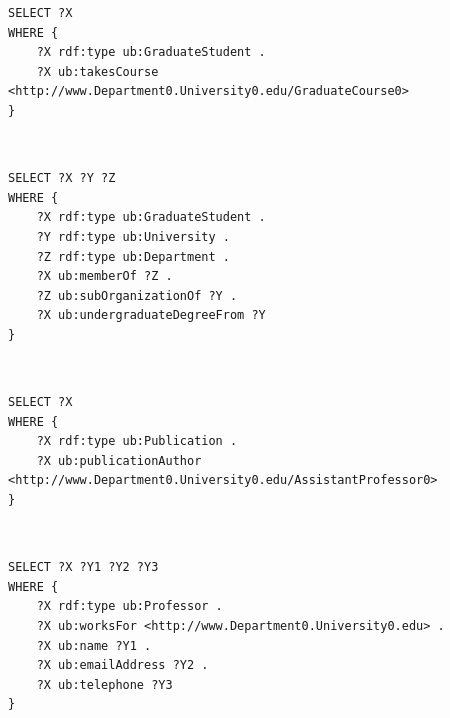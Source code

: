 \documentclass[10pt, a4paper]{report}
\begin{document}
\begin{enumerate}
	\begin{minipage}{0.92\textwidth}
		\item \label{query:lumb_sparql_1}
		\lstset{language=sql}
		\begin{lstlisting}
SELECT ?X
WHERE {
    ?X rdf:type ub:GraduateStudent .
    ?X ub:takesCourse <http://www.Department0.University0.edu/GraduateCourse0>
}
                        \end{lstlisting}
	\end{minipage} \\
	\begin{minipage}{0.92\textwidth}
		\item \label{query:lumb_sparql_2}
		\lstset{language=sql}
		\begin{lstlisting}
SELECT ?X ?Y ?Z
WHERE {
    ?X rdf:type ub:GraduateStudent .
    ?Y rdf:type ub:University .
    ?Z rdf:type ub:Department .
    ?X ub:memberOf ?Z .
    ?Z ub:subOrganizationOf ?Y .
    ?X ub:undergraduateDegreeFrom ?Y
}
                        \end{lstlisting}
	\end{minipage} \\
	\begin{minipage}{0.92\textwidth}
		\item \label{query:lumb_sparql_3}
		\lstset{language=sql}
		\begin{lstlisting}
SELECT ?X
WHERE {
    ?X rdf:type ub:Publication .
    ?X ub:publicationAuthor <http://www.Department0.University0.edu/AssistantProfessor0>
}
                        \end{lstlisting}
	\end{minipage} \\
	\begin{minipage}{0.92\textwidth}
		\item \label{query:lumb_sparql_4}
		\lstset{language=sql}
		\begin{lstlisting}
SELECT ?X ?Y1 ?Y2 ?Y3
WHERE {
    ?X rdf:type ub:Professor .
    ?X ub:worksFor <http://www.Department0.University0.edu> .
    ?X ub:name ?Y1 .
    ?X ub:emailAddress ?Y2 .
    ?X ub:telephone ?Y3
}
                        \end{lstlisting}
	\end{minipage} \\
	\begin{minipage}{0.92\textwidth}
		\item \label{query:lumb_sparql_5}
		\lstset{language=sql}
		\begin{lstlisting}

\end{lstlisting}
\end{minipage}
\end{enumerate}
\end{document}
